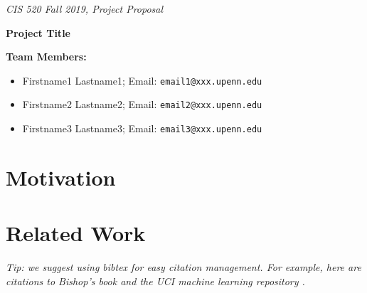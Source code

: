 \documentclass[english]{article}
\begin{document}
\emph{\footnotesize{CIS 520 Fall 2019, Project Proposal}}



\vspace{12pt}



\textbf{\Large{Project Title}}

\vspace{1cm}

\textbf{Team Members:}

\begin{itemize}
 \item Firstname1 Lastname1; Email: \texttt{email1@xxx.upenn.edu}
 \item Firstname2 Lastname2; Email: \texttt{email2@xxx.upenn.edu}
 \item Firstname3 Lastname3; Email: \texttt{email3@xxx.upenn.edu} 
\end{itemize}

\hline




\section{Motivation}

\section{Related Work}

\textit{Tip: we suggest using bibtex for easy citation management. For example, here are citations to Bishop's book \cite{Bishop06} and the UCI machine learning repository \cite{DuaKa17}.}
\end{document}
